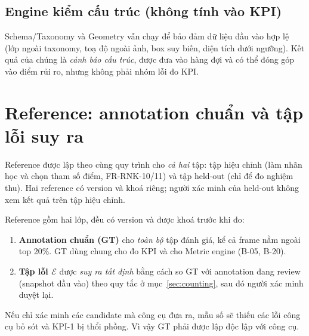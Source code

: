 \subsection{Engine kiểm cấu trúc (không tính vào KPI)}
Schema/Taxonomy và Geometry vẫn chạy để bảo đảm dữ liệu đầu vào hợp lệ (lớp
ngoài taxonomy, toạ độ ngoài ảnh, box suy biến, diện tích dưới ngưỡng). Kết quả
của chúng là \emph{cảnh báo cấu trúc}, được đưa vào hàng đợi và có thể đóng góp
vào điểm rủi ro, nhưng không phải nhóm lỗi đo KPI.

\section{Reference: annotation chuẩn và tập lỗi suy ra}
\label{sec:reference}
Reference được lập theo cùng quy trình cho \emph{cả hai} tập: tập hiệu chỉnh
(làm nhãn học và chọn tham số điểm, FR-RNK-10/11) và tập held-out (chỉ để đo
nghiệm thu). Hai reference có version và khoá riêng; người xác minh của held-out
không xem kết quả trên tập hiệu chỉnh.

Reference gồm hai lớp, đều có version và được khoá trước khi đo:

\begin{enumerate}
  \item \textbf{Annotation chuẩn (GT)} cho \emph{toàn bộ} tập đánh giá, kể cả
        frame nằm ngoài top 20\%. GT dùng chung cho đo KPI và cho Metric engine
        (B-05, B-20).
  \item \textbf{Tập lỗi \(\mathcal{E}\)} được \emph{suy ra tất định} bằng cách so
        GT với annotation đang review (snapshot đầu vào) theo quy tắc ở
        mục~\ref{sec:counting}, sau đó người xác minh duyệt lại.
\end{enumerate}

Nếu chỉ xác minh các candidate mà công cụ đưa ra, mẫu số sẽ thiếu các lỗi công
cụ bỏ sót và KPI-1 bị thổi phồng. Vì vậy GT phải được lập độc lập với công cụ.

